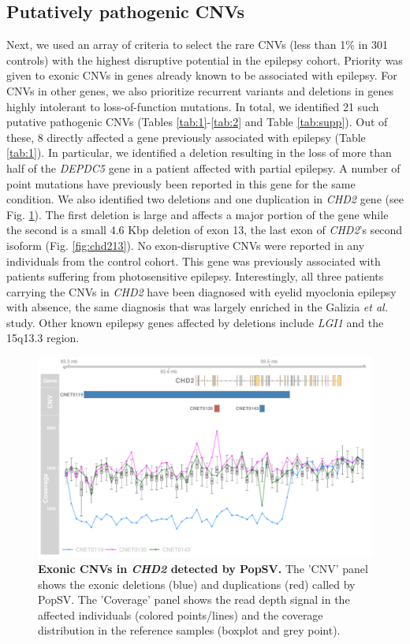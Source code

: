 \subsection*{Putatively pathogenic CNVs}
Next, we used an array of criteria to select the rare CNVs (less than 1\% in 301 controls) with the highest disruptive potential in the epilepsy cohort.
Priority was given to exonic CNVs in genes already known to be associated with epilepsy.
For CNVs in other genes, we also prioritize recurrent variants and deletions in genes highly intolerant to loss-of-function mutations.
In total, we identified 21 such putative pathogenic CNVs (Tables \ref{tab:1}-\ref{tab:2} and Table \ref{tab:supp}).
Out of these, 8 directly affected a gene previously associated with epilepsy\cite{Ran2015} (Table \ref{tab:1}).
In particular, we identified a deletion resulting in the loss of more than half of the \textit{DEPDC5} gene in a patient affected with partial epilepsy.
A number of point mutations have previously been reported in this gene for the same condition\cite{Dibbens2013,Ishida2013}.
We also identified two deletions and one duplication in \textit{CHD2} gene (see Fig. \ref{fig:popsvCHD2}).
The first deletion is large and affects a major portion of the gene while the second is a small 4.6 Kbp deletion of exon 13, the last exon of {\it CHD2}'s second isoform (Fig. \ref{fig:chd213}).
No exon-disruptive CNVs were reported in any individuals from the control cohort.
This gene was previously associated with patients suffering from photosensitive epilepsy\cite{Galizia2015}.
Interestingly, all three patients carrying the CNVs in \textit{CHD2} have been diagnosed with eyelid myoclonia epilepsy with absence, the same diagnosis that was largely enriched in the Galizia \textit{et al.} study.
Other known epilepsy genes affected by deletions include \textit{LGI1} and the 15q13.3 region.

\begin{figure}[!h]
  \centering
  \includegraphics[width=.8\linewidth, page=1]{figures/EpiPopSV-example.pdf}
  \caption[Exonic CNVs in {\it CHD2} detected by {\sf PopSV}.]{{\bf Exonic CNVs in {\it CHD2} detected by {\sf PopSV}.} {\small The 'CNV' panel shows the exonic deletions (blue) and duplications (red) called by {\sf PopSV}. The 'Coverage' panel shows the read depth signal in the affected individuals (colored points/lines) and the coverage distribution in the reference samples (boxplot and grey point).}}
  \label{fig:popsvCHD2}
\end{figure}

